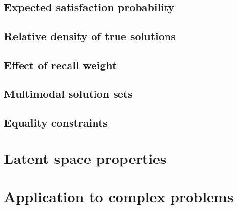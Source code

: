 \documentclass[../../main.tex]{subfiles}
\begin{document}
\subsection{Expected satisfaction probability}
\subsection{Relative density of true solutions}
\subsection{Effect of recall weight}
\subsection{Multimodal solution sets}
\subsection{Equality constraints}

\section{Latent space properties}

\section{Application to complex problems}
\end{document}
